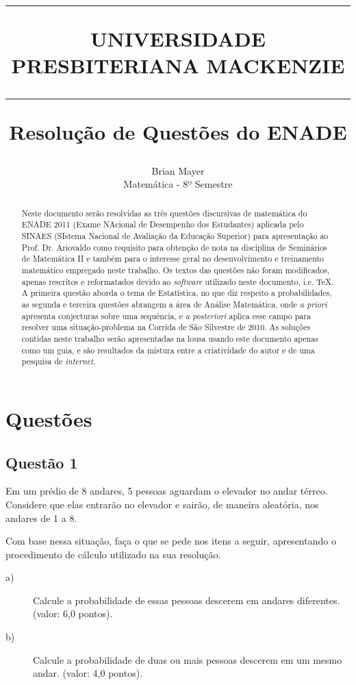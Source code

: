 \documentclass[12pt]{article}
\title{\hrule \vspace{11pt} \Large{\color{red} UNIVERSIDADE PRESBITERIANA MACKENZIE} \vspace{10pt}\\
\hrule \vspace{60pt}
\color{blue} Resolução de Questões do ENADE}
\author{Brian Mayer\\
\color{red} Matemática - 8º Semestre}
\date{}
\begin{document}
\maketitle

\begin{abstract}
Neste documento serão resolvidas as três questões discursivas de matemática do ENADE 2011 (Exame NAcional de Desempenho dos Estudantes) aplicada pelo SINAES (SIstema Nacional de Avaliação da Educação Superior) para apresentação ao Prof. Dr. Ariovaldo como requisito para obtenção de nota na disciplina de Seminários de Matemática II e também para o interesse geral no desenvolvimento e treinamento matemático empregado neste trabalho. Os textos das questões não foram modificados, apenas rescritos e reformatados devido ao \emph{software} utilizado neste documento, i.e. \TeX. A primeira questão aborda o tema de Estatística, no que diz respeito a probabilidades, as segunda e terceira questões abrangem a área de Análise Matemática, onde \emph{a priori} apresenta conjecturas sobre uma sequência, e \emph{a posteriori} aplica esse campo para resolver uma situação-problema na Corrida de São Silvestre de 2010. As soluções contidas neste trabalho serão apresentadas na lousa usando este documento apenas como um guia, e são resultados da mistura entre a criatividade do autor e de uma pesquisa de \emph{internet}.
\end{abstract}

\section*{\color{blue} Questões}

\subsection*{\color{blue} Questão 1}

Em um prédio de 8 andares, 5 pessoas aguardam o elevador no andar térreo. Considere que elas entrarão no elevador e sairão, de maneira aleatória, nos andares de 1 a 8.

Com base nessa situação, faça o que se pede nos itens a seguir, apresentando o procedimento de cálculo utilizado na sua resolução.

\begin{description}

\item[a)] Calcule a probabilidade de essas pessoas descerem em andares diferentes. (valor: 6,0 pontos).

\item[b)] Calcule a probabilidade de duas ou mais pessoas descerem em um mesmo andar. (valor: 4,0 pontos).

\end{description}
\end{document}
